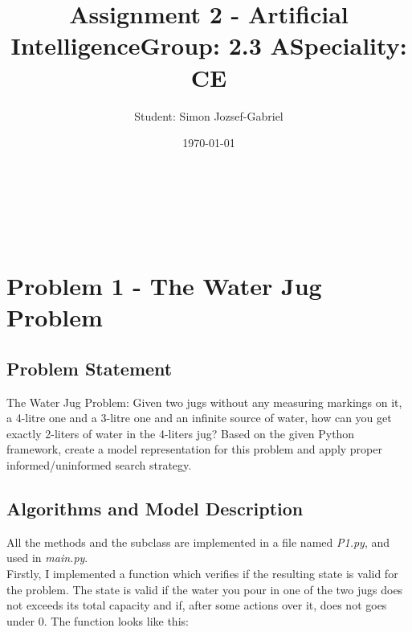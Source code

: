 \documentclass[14pt]{article}
\begin{document}
\title{\huge Assignment 2 - Artificial Intelligence}
\date{\today}
\maketitle
\begin{center}
\vspace{30 mm}

\author{\huge Student: Simon Jozsef-Gabriel}
\\\vspace{10 mm}
\title{\huge Group: 2.3 A}
\\\vspace{10 mm}
\title{\huge Speciality: CE}
\date{}
\maketitle
\newpage
\end{center}
\tableofcontents
\newpage
\section{Problem 1 - The Water Jug Problem}
\subsection{Problem Statement}
The Water Jug Problem: Given two jugs without any
measuring markings on it, a 4-litre one and a 3-litre one and an infinite source
of water, how can you get exactly 2-liters of water in the 4-liters jug?
Based on the given Python framework, create a model representation for this
problem and apply proper informed/uninformed search strategy.
\subsection{Algorithms and Model Description}
All the methods and the subclass are implemented in a file named \textit{P1.py}, and used in \textit{main.py}.
\vspace{2.5 mm}
\\Firstly, I implemented a function which verifies if the resulting state is valid for the problem. The state is valid if the water you pour in one of the two jugs does not exceeds its total capacity and if, after some actions over it, does not goes under 0. The function looks like this:
\end{document}
